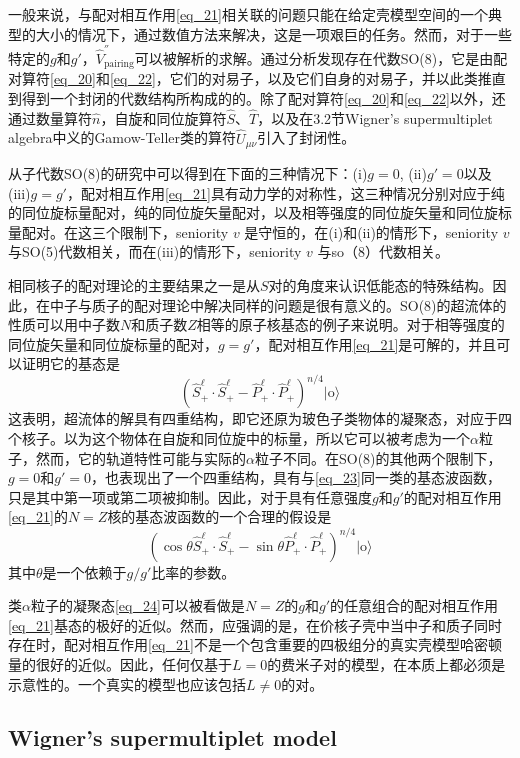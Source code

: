 一般来说，与配对相互作用\ref{eq_21}相关联的问题只能在给定壳模型空间的一个典型的大小的情况下，通过数值方法来解决，这是一项艰巨的任务。然而，对于一些特定的$g$和$g'$，$\widehat{V}^{''}_\textrm{pairing}$可以被解析的求解。通过分析发现存在代数SO(8)，它是由配对算符\ref{eq_20}和\ref{eq_22}，它们的对易子，以及它们自身的对易子，并以此类推直到得到一个封闭的代数结构所构成的的。除了配对算符\ref{eq_20}和\ref{eq_22}以外，还通过数量算符$\widehat{n}$，自旋和同位旋算符$\widehat{S}$、$\widehat{T}$，以及在3.2节Wigner's supermultiplet algebra中义的Gamow-Teller类的算符$\widehat{U}_{\mu\nu}$引入了封闭性。

从子代数SO(8)的研究中可以得到在下面的三种情况下：(i)$g=0$, (ii)$g'=0$以及(iii)$g=g'$，配对相互作用\ref{eq_21}具有动力学的对称性，这三种情况分别对应于纯的同位旋标量配对，纯的同位旋矢量配对，以及相等强度的同位旋矢量和同位旋标量配对。在这三个限制下，seniority $v$ 是守恒的，在(i)和(ii)的情形下，seniority $v$ 与SO(5)代数相关，而在(iii)的情形下，seniority $v$ 与so（8）代数相关。

相同核子的配对理论的主要结果之一是从$S$对的角度来认识低能态的特殊结构。因此，在中子与质子的配对理论中解决同样的问题是很有意义的。SO(8)的超流体的性质可以用中子数$N$和质子数$Z$相等的原子核基态的例子来说明。对于相等强度的同位旋矢量和同位旋标量的配对，$g=g'$，配对相互作用\ref{eq_21}是可解的，并且可以证明它的基态是
\begin{equation}\label{eq_23}
\left(\widehat{S}_+^\ell\cdot\widehat{S}_+^\ell-\widehat{P}_+^\ell\cdot\widehat{P}_+^\ell\right)^{n/4}|\textrm{o}\rangle
\end{equation}
这表明，超流体的解具有四重结构，即它还原为玻色子类物体的凝聚态，对应于四个核子。以为这个物体在自旋和同位旋中的标量，所以它可以被考虑为一个$\alpha$粒子，然而，它的轨道特性可能与实际的$\alpha$粒子不同。在SO(8)的其他两个限制下，$g=0$和$g'=0$，也表现出了一个四重结构，具有与\ref{eq_23}同一类的基态波函数，只是其中第一项或第二项被抑制。因此，对于具有任意强度$g$和$g'$的配对相互作用\ref{eq_21}的$N=Z$核的基态波函数的一个合理的假设是
\begin{equation}\label{eq_24}
\left(\cos\theta\widehat{S}^\ell_+\cdot\widehat{S}^\ell_+-\sin\theta\widehat{P}_+^\ell\cdot\widehat{P}_+^\ell\right)^{n/4}|\textrm{o}\rangle
\end{equation}
其中$\theta$是一个依赖于$g/g'$比率的参数。

类$\alpha$粒子的凝聚态\ref{eq_24}可以被看做是$N=Z$的$g$和$g'$的任意组合的配对相互作用\ref{eq_21}基态的极好的近似。然而，应强调的是，在价核子壳中当中子和质子同时存在时，配对相互作用\ref{eq_21}不是一个包含重要的四极组分的真实壳模型哈密顿量的很好的近似。因此，任何仅基于$L=0$的费米子对的模型，在本质上都必须是示意性的。一个真实的模型也应该包括$L\ne0$的对。
\subsection{Wigner's supermultiplet model}